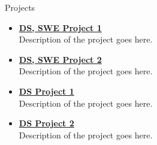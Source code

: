\documentclass[]{../mcdowellcv}
\begin{document}
\begin{cvsection}{Projects}

    \begin{cvsubsection}{}{}{}
        \begin{itemize}
            \setlength\itemsep{3pt}
            \item\textbf{\href{https://github.com/johndoe/beepboop}{DS, SWE Project 1}} \\
            Description of the project goes here.
        \end{itemize}
    \end{cvsubsection}
    
    \begin{cvsubsection}{}{}{}
        \begin{itemize}
            \setlength\itemsep{3pt}
            \item\textbf{\href{https://github.com/johndoe/beepboop}{DS, SWE Project 2}} \\
            Description of the project goes here.
        \end{itemize}
    \end{cvsubsection}
    
    \begin{cvsubsection}{}{}{}
        \begin{itemize}
            \setlength\itemsep{3pt}
            \item\textbf{\href{https://github.com/johndoe/beepboop}{DS Project 1}} \\
            Description of the project goes here.
        \end{itemize}
    \end{cvsubsection}
    
    \begin{cvsubsection}{}{}{}
        \begin{itemize}
            \setlength\itemsep{3pt}
            \item\textbf{\href{https://github.com/johndoe/beepboop}{DS Project 2}} \\
            Description of the project goes here.
        \end{itemize}
    \end{cvsubsection}
    
\end{cvsection}
\end{document}
